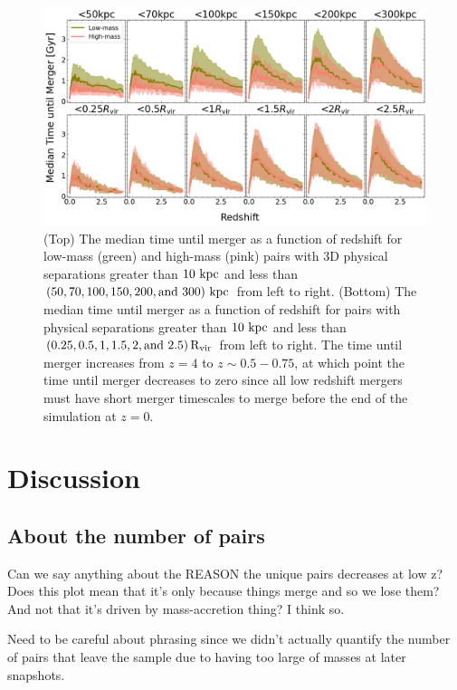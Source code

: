 \documentclass[twocolumn,linenumbers]{aastex631}
\newcommand{\Rvir}{\ensuremath{\rm R_{vir}}}
\begin{document}
\begin{figure}[htb]
    \centering
    \includegraphics[width=\textwidth]{plots/bet-on-it/3_time_til_merger.png}
    \caption{(Top) The median time until merger as a function of redshift for low-mass (green) and high-mass (pink) pairs with 3D physical separations greater than $10\,\mathrm{\,kpc}$ and less than $(50,70,100,150,200,\mbox{and }300)\,\mathrm{\,kpc}$ from left to right. 
    (Bottom) The median time until merger as a function of redshift for pairs with physical separations greater than $10\,\mathrm{\,kpc}$ and less than $(0.25, 0.5, 1, 1.5, 2,\mbox{and }2.5)\,\Rvir$ from left to right. 
    The time until merger increases from $z=4$ to $z\sim0.5-0.75$, at which point the time until merger decreases to zero since all low redshift mergers must have short merger timescales to merge before the end of the simulation at $z=0$. 
    }
    \label{fig:timescales-sep}
\end{figure}


\section{Discussion}

\subsection{About the number of pairs}
Can we say anything about the REASON the unique pairs decreases at low z? Does this plot mean that it's only because things merge and so we lose them? And not that it's driven by mass-accretion thing? I think so.

Need to be careful about phrasing since we didn't actually quantify the number of pairs that leave the sample due to having too large of masses at later snapshots. 
\end{document}
